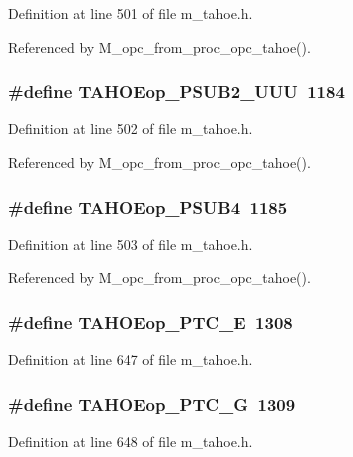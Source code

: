 Definition at line 501 of file m\_\-tahoe.h.

Referenced by M\_\-opc\_\-from\_\-proc\_\-opc\_\-tahoe().
\subsubsection{\setlength{\rightskip}{0pt plus 5cm}\#define TAHOEop\_\-PSUB2\_\-UUU~1184}\label{m__tahoe_8h_aa43870192f9b67a30db469649592af2}




Definition at line 502 of file m\_\-tahoe.h.

Referenced by M\_\-opc\_\-from\_\-proc\_\-opc\_\-tahoe().
\subsubsection{\setlength{\rightskip}{0pt plus 5cm}\#define TAHOEop\_\-PSUB4~1185}\label{m__tahoe_8h_034a233a3cc4c76477809f4bc8ad3345}




Definition at line 503 of file m\_\-tahoe.h.

Referenced by M\_\-opc\_\-from\_\-proc\_\-opc\_\-tahoe().
\subsubsection{\setlength{\rightskip}{0pt plus 5cm}\#define TAHOEop\_\-PTC\_\-E~1308}\label{m__tahoe_8h_fc87ba78a0c939d684317ff2f4c16b1b}




Definition at line 647 of file m\_\-tahoe.h.
\subsubsection{\setlength{\rightskip}{0pt plus 5cm}\#define TAHOEop\_\-PTC\_\-G~1309}\label{m__tahoe_8h_73ba13e418feaa6713a72c0785bda528}




Definition at line 648 of file m\_\-tahoe.h.
